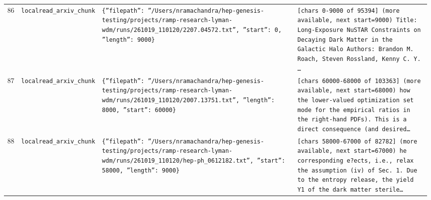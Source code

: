 \documentclass[11pt,a4paper]{article}
\begin{document}
\begin{longtable}{@{}p{}p{}p{}p{}@{}}
86 & \texttt{local}\newline\texttt{read\_\allowbreak{}arxiv\_\allowbreak{}chunk} & \texttt{\{''filepath'':\allowbreak{} ''/\allowbreak{}Users/\allowbreak{}nramachandra/\allowbreak{}hep-genesis-testing/\allowbreak{}projects/\allowbreak{}ramp-research-lyman-wdm/\allowbreak{}runs/\allowbreak{}261019\_\allowbreak{}110120/\allowbreak{}2207.04572.txt'',\allowbreak{} ''start'':\allowbreak{} 0,\allowbreak{} ''length'':\allowbreak{} 9000\}\allowbreak{}} & \texttt{[chars 0-9000 of 95394]\allowbreak{} (more available,\allowbreak{} next start=\allowbreak{}9000)\allowbreak{}  Title:\allowbreak{} Long-Exposure NuSTAR Constraints on Decaying Dark Matter in the Galactic Halo Authors:\allowbreak{} Brandon M. Roach,\allowbreak{} Steven Rossland,\allowbreak{} Kenny C. Y. \ldots{}\allowbreak{}} \\
87 & \texttt{local}\newline\texttt{read\_\allowbreak{}arxiv\_\allowbreak{}chunk} & \texttt{\{''filepath'':\allowbreak{} ''/\allowbreak{}Users/\allowbreak{}nramachandra/\allowbreak{}hep-genesis-testing/\allowbreak{}projects/\allowbreak{}ramp-research-lyman-wdm/\allowbreak{}runs/\allowbreak{}261019\_\allowbreak{}110120/\allowbreak{}2007.13751.txt'',\allowbreak{} ''length'':\allowbreak{} 8000,\allowbreak{} ''start'':\allowbreak{} 60000\}\allowbreak{}} & \texttt{[chars 60000-68000 of 103363]\allowbreak{} (more available,\allowbreak{} next start=\allowbreak{}68000)\allowbreak{}  how the lower-valued optimization set mode for the empirical ratios in the right-hand PDFs)\allowbreak{}. This is a direct consequence (and desired\ldots{}\allowbreak{}} \\
88 & \texttt{local}\newline\texttt{read\_\allowbreak{}arxiv\_\allowbreak{}chunk} & \texttt{\{''filepath'':\allowbreak{} ''/\allowbreak{}Users/\allowbreak{}nramachandra/\allowbreak{}hep-genesis-testing/\allowbreak{}projects/\allowbreak{}ramp-research-lyman-wdm/\allowbreak{}runs/\allowbreak{}261019\_\allowbreak{}110120/\allowbreak{}hep-ph\_\allowbreak{}0612182.txt'',\allowbreak{} ''start'':\allowbreak{} 58000,\allowbreak{} ''length'':\allowbreak{} 9000\}\allowbreak{}} & \texttt{[chars 58000-67000 of 82782]\allowbreak{} (more available,\allowbreak{} next start=\allowbreak{}67000)\allowbreak{}  he corresponding e?ects,\allowbreak{} i.e.,\allowbreak{} relax the assumption (iv)\allowbreak{} of Sec. 1. Due to the entropy release,\allowbreak{} the yield Y1 of the dark matter sterile\ldots{}\allowbreak{}} \\

\end{longtable}
\end{document}

